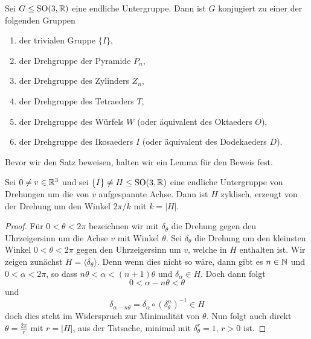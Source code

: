 \documentclass{book}
\begin{document}
\begin{thm}
    \label{thm:klass3d} Sei $G \le \operatorname{SO}(3,\mathbb{R})$ eine endliche Untergruppe. Dann ist $G$ konjugiert zu einer der folgenden Gruppen
    \begin{enumerate}[label=(\alph*)]
        \item\label{klass:1} der trivialen Gruppe $\{I\}$, 
        \item\label{klass:2} der Drehgruppe der Pyramide $P_n$,
        \item\label{klass:3} der Drehgruppe des Zylinders $Z_n$,
        \item\label{klass:4} der Drehgruppe des Tetraeders $T$,
        \item\label{klass:5} der Drehgruppe des Würfels $W$ (oder äquivalent des Oktaeders $O$),
        \item\label{klass:6} der Drehgruppe des Ikosaeders $I$ (oder äquivalent des Dodekaeders $D$).
    \end{enumerate}
\end{thm}

Bevor wir den Satz beweisen, halten wir ein Lemma für den Beweis fest. 

\begin{lem}
    \label{lem:rotcyc}
    Sei $0 \neq v \in \mathbb{R}^3$ und sei $\{I\} \neq H \le \operatorname{SO}(3,\mathbb{R})$ eine endliche
    Untergruppe von Drehungen um die von $v$ aufgespannte Achse. Dann ist $H$
    zyklisch, erzeugt von der Drehung um den Winkel $2 \pi / k$ mit $k = |H|$. 
\end{lem}
\begin{proof}
    Für $0 < \theta < 2 \pi$ bezeichnen wir mit $\delta_{\theta}$ die Drehung
    gegen den Uhrzeigersinn um die Achse $v$ mit Winkel $\theta$. 
    Sei $\delta_{\theta}$ die Drehung um den kleinsten Winkel $0 < \theta < 2 \pi$ gegen den 
    Uhrzeigersinn um $v$, welche in $H$ enthalten ist. Wir zeigen zunächst $H =
    \langle \delta_{\theta} \rangle$. Denn wenn dies nicht so wäre, dann gibt es $n \in
    \mathbb{N}$ und $0 < \alpha < 2 \pi$, so dass $n \theta < \alpha < (n+1) \theta$
    und $\delta_{\alpha} \in H$. Doch dann folgt
    \[
        0 < \alpha - n \theta < \theta
    \]
    und 
    \[
        \delta_{\alpha - n \theta} = \delta_{\alpha} \circ (\delta_{\theta}^n)^{-1} \in H
    \]
    doch dies steht im Widerspruch zur Minimalität von $\theta$. Nun folgt auch
    direkt $\theta = \frac{2 \pi}{r}$ mit $r = |H|$, aus der Tatsache, minimal
    mit $\delta_{\theta}^r = 1$, $r > 0$ ist.  
\end{proof}
\end{document}

